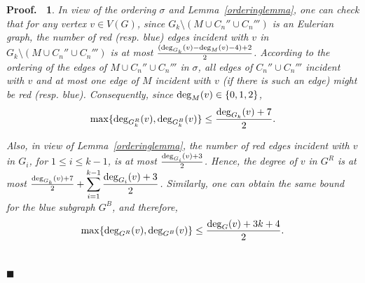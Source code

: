 \documentclass[11pt]{article}
\newtheorem{preproof}{{\bf Proof.\ }}
\newenvironment{proof}[1]{\begin{preproof}{\rm
               #1}\hfill{$\blacksquare$}}{\end{preproof}}
\begin{document}
\begin{proof}
{%
In view of the ordering $\sigma$ and Lemma~\ref{orderinglemma}, one can check that 
for any vertex $v\in V(G)$, since $G_k\setminus (M\cup C_n''\cup C_n''')$ is an Eulerian graph,
the number of red (resp. blue) edges incident with $v$ in $G_k\setminus (M\cup C_n''\cup C_n''')$ is at most 
${({\rm deg}_{G_k}(v)-{\rm deg}_{M}(v)-4)+2\over 2}$.
According to the ordering of the edges of $M\cup C_n''\cup C_n'''$ in $\sigma$,
all edges of $C_n''\cup C_n'''$  incident with $v$  and at most one edge of $M$ incident with $v$  (if there is such an edge) might be red (resp. blue). 
Consequently, since ${\rm deg}_{M}(v)\in\{0,1,2\}$, 
\begin{equation}\label{degGk}
\max\{{\rm deg}_{G_k^R}(v), {\rm deg}_{G_k^B}(v)\}\leq{{\rm deg}_{G_k}(v)+7\over 2}. 
\end{equation} 

Also, in view of Lemma~\ref{orderinglemma}, the number of red edges incident with $v$ in $G_i$, for $1\leq i\leq k-1$,  is at most 
${{\rm deg}_{G_i}(v)+3\over 2}$. Hence, the degree of $v$ in $G^R$ is at most $ {{\rm deg}_{G_k}(v)+7\over 2}+\displaystyle\sum_{i=1}^{k-1}{{\rm deg}_{G_i}(v)+3\over 2}$. Similarly, one can obtain the same bound for the blue subgraph $G^B$, and therefore, 
\begin{equation}\label{degree}
\max\{{\rm deg}_{G^R}(v), {\rm deg}_{G^B}(v)\}\leq  {{\rm deg}_G(v)+3k+4\over 2}.
\end{equation}\\

}
\end{proof}
\end{document}
